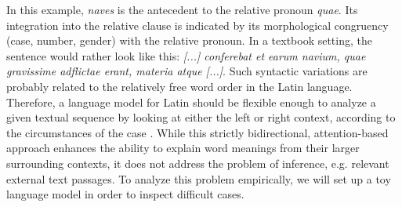 In this example, \textit{naves} is the antecedent to the relative pronoun \textit{quae}. Its integration into the relative clause is indicated by its morphological congruency (case, number, gender) with the relative pronoun. In a textbook setting, the sentence would rather look like this: \textit{[...] conferebat et earum navium, quae gravissime adflictae erant, materia atque [...]}. Such syntactic variations are probably related to the relatively free word order in the Latin language. Therefore, a language model for Latin should be flexible enough to analyze a given textual sequence by looking at either the left or right context, according to the circumstances of the case \parencite[8]{devlinBERTPretrainingDeep2019}. While this strictly bidirectional, attention-based approach \parencite{vaswaniAttentionAllYou2017} enhances the ability to explain word meanings from their larger surrounding contexts, it does not address the problem of inference, e.g. relevant external text passages. To analyze this problem empirically, we will set up a toy language model in order to inspect difficult cases.